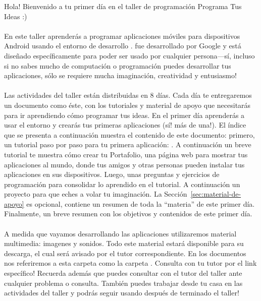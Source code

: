 Hola! Bienvenido a tu primer día en el taller de programación Programa
Tus Ideas :)

\paragraph{}
En este taller aprenderás a programar aplicaciones móviles para
dispositivos Android usando el entorno de desarrollo \AppInventor.
\AppInventor fue desarrollado por Google y está diseñado
específicamente para poder ser usado por cualquier persona---sí,
incluso si no sabes mucho de computación o programación puedes
desarrollar tus aplicaciones, sólo se requiere mucha imaginación,
creatividad y entusiasmo!

\paragraph{}
Las actividades del taller están distribuidas en 8 días. Cada día te
entregaremos un documento como éste, con los tutoriales y material de
apoyo que necesitarás para ir aprendiendo cómo programar tus ideas. En
el primer día aprenderás a usar el entorno \AppInventor y crearás tus
primeras aplicaciones (sí! más de una!). El índice que se presenta a
continuación muestra el contenido de este documento: primero, un
tutorial paso por paso para tu primera aplicación: . A continuación un breve tutorial te muestra cómo crear tu
Portafolio, una página web para mostrar tus aplicaciones al mundo,
donde tus amigos y otras personas pueden instalar tus aplicaciones en
sus dispositivos. Luego, unas preguntas y ejercicios de programación
para consolidar lo aprendido en el tutorial. A continuación un
proyecto para que eches a volar tu imaginación. La
Sección~\ref{sec:material-de-apoyo} es opcional, contiene un resumen
de toda la ``materia'' de este primer día. Finalmente, un breve
resumen con los objetivos y contenidos de este primer día.

\paragraph{}
A medida que vayamos desarrollando las aplicaciones utilizaremos
material multimedia: imagenes y sonidos. Todo este material estará
disponible para su descarga, el cual será avisado por el tutor
correspondiente. En los documentos nos referiremos a esta carpeta como
la carpeta . Consulta con tu tutor por el
link específico! Recuerda además que puedes consultar con el tutor del
taller ante cualquier problema o consulta. También puedes trabajar
desde tu casa en las actividades del taller y podrás seguir usando
\AppInventor después de terminado el taller!
